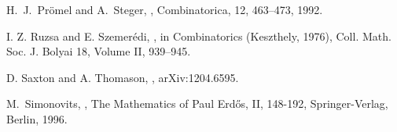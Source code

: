 \documentclass[12pt]{article}
\theoremstyle{definition}
\theoremstyle{definition}
\theoremstyle{definition}
\theoremstyle{definition}
\theoremstyle{definition}
\theoremstyle{definition}
\theoremstyle{definition}
\newcommand{\3}{\bf{3}}
\begin{document}
\begin{thebibliography}{99}
 H.~J.~Pr\"omel and A.~Steger, 
, 
\newblock Combinatorica, 12, 463--473, 1992.
  
I. Z. Ruzsa and E. Szemer\'{e}di, , in
Combinatorics (Keszthely, 1976), Coll. Math. Soc. J. Bolyai 18, Volume II, 939--945.

D. Saxton and A. Thomason, , \newblock arXiv:1204.6595.
  
  M.~Simonovits, , \newblock The Mathematics of Paul Erd\H{o}s, II, 148-192, Springer-Verlag, Berlin, 1996.
  

\end{thebibliography}
\end{document}

